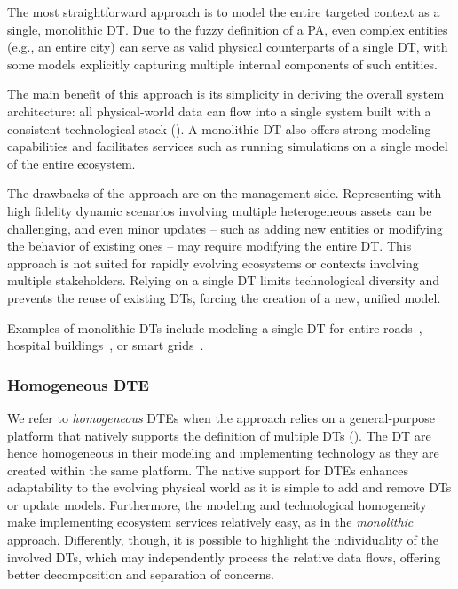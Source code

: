 The most straightforward approach is to model the entire targeted context as a single, monolithic \ac{DT}.
Due to the fuzzy definition of a \ac{PA}, even complex entities (e.g., an entire city) can serve as valid physical counterparts of a single \ac{DT}, with some models explicitly capturing multiple internal components of such entities.

The main benefit of this approach is its simplicity in deriving the overall system architecture:
all physical-world data can flow into a single system built with a consistent technological stack ().
%
A monolithic \ac{DT} also offers strong modeling capabilities and facilitates services such as running simulations on a single model of the entire ecosystem.

The drawbacks of the approach are on the management side. Representing with high fidelity dynamic scenarios involving multiple heterogeneous assets can be challenging, and even minor updates -- such as adding new entities or modifying the behavior of existing ones -- may require modifying the entire \ac{DT}.
%
This approach is not suited for rapidly evolving ecosystems or contexts involving multiple stakeholders.
%
Relying on a single \ac{DT} limits technological diversity and prevents the reuse of existing \acp{DT}, forcing the creation of a new, unified model.

Examples of monolithic \acp{DT} include modeling a single \ac{DT} for entire roads~\cite{KUSIC2023101858}, hospital buildings~\cite{dt_hospital}, or smart grids~\cite{9449682}. 

\subsubsection{Homogeneous \acl{DTE}}
\label{sssec:homogeneous}

We refer to \emph{homogeneous} \acp{DTE} when the approach relies on a general-purpose platform that natively supports the definition of multiple \acp{DT} ().
%
The \ac{DT} are hence homogeneous in their modeling and implementing technology as they are created within the same platform.
%
The native support for \acp{DTE} enhances adaptability to the evolving physical world as it is simple to add and remove \acp{DT} or update models.
%
Furthermore, the modeling and technological homogeneity make implementing ecosystem services relatively easy, as in the \emph{monolithic} approach.
%
Differently, though, it is possible to highlight the individuality of the involved \acp{DT}, which may independently process the relative data flows, offering better decomposition and separation of concerns.

